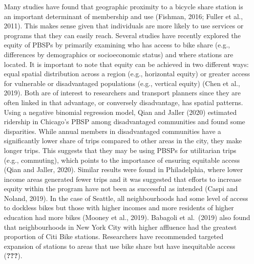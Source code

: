 \documentclass[]{elsarticle} %
\begin{document}
Many studies have found that geographic proximity to a bicycle share
station is an important determinant of membership and use (Fishman,
2016; Fuller et al., 2011). This makes sense given that individuals are
more likely to use services or programs that they can easily reach.
Several studies have recently explored the equity of PBSPs by primarily
examining who has access to bike share (e.g., differences by
demographics or socioeconomic status) and where stations are located. It
is important to note that equity can be achieved in two different ways:
equal spatial distribution across a region (e.g., horizontal equity) or
greater access for vulnerable or disadvantaged populations (e.g.,
vertical equity) (Chen et al., 2019). Both are of interest to
researchers and transport planners since they are often linked in that
advantage, or conversely disadvantage, has spatial patterns. Using a
negative binomial regression model, Qian and Jaller (2020) estimated
ridership in Chicago's PBSP among disadvantaged communities and found
some disparities. While annual members in disadvantaged communities have
a significantly lower share of trips compared to other areas in the
city, they make longer trips. This suggests that they may be using PBSPs
for utilitarian trips (e.g., commuting), which points to the importance
of ensuring equitable access (Qian and Jaller, 2020). Similar results
were found in Philadelphia, where lower income areas generated fewer
trips and it was suggested that efforts to increase equity within the
program have not been as successful as intended (Caspi and Noland,
2019). In the case of Seattle, all neighbourhoods had some level of
access to dockless bikes but those with higher incomes and more
residents of higher education had more bikes (Mooney et al., 2019).
Babagoli et al.~(2019) also found that neighbourhoods in New York City
with higher affluence had the greatest proportion of Citi Bike stations.
Researchers have recommended targeted expansion of stations to areas
that use bike share but have inequitable access ({\textbf{???}}).
\end{document}
